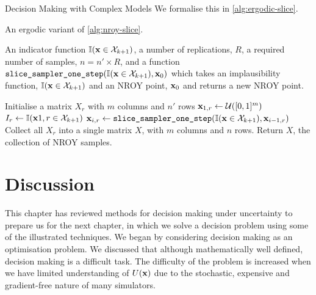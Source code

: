 \begin{chapter}{Decision Making with Complex Models \label{Chap:optimisation}}
We formalise this in \cref{alg:ergodic-slice}.

\begin{algorithm}[h]
\caption{An ergodic variant of \cref{alg:nroy-slice}. \label{alg:ergodic-slice}}
\begin{algorithmic}
\Require An indicator function $\mathbb{I}(\mathbf{x} \in \mathcal{X}_{k+1})$, a number of replications, $R$, a required number of samples, $n =  n' \times R$, and a function $\texttt{slice\_sampler\_one\_step}(\mathbb{I}(\mathbf{x} \in \mathcal{X}_{k+1}), \mathbf{x}_0)$ which takes an implausibility function, $\mathbb{I}(\mathbf{x} \in \mathcal{X}_{k+1})$ and an NROY point, $\mathbf{x}_0$ and returns a new NROY point.

  \State Initialise a matrix $X_r$ with $m$ columns and $n'$ rows
    \State $\mathbf{x}_{1, r} \gets \mathcal{U}([0, 1]^m)$
    \State $I_r \gets \mathbb{I}(\mathbf{x}{1, r} \in \mathcal{X}_{k+1})$
  \EndWhile
  \State $\mathbf{x}_{i, r} \gets \texttt{slice\_sampler\_one\_step}(\mathbb{I}(\mathbf{x} \in \mathcal{X}_{k+1}), \mathbf{x}_{i-1, r})$
\EndFor
\EndFor
\State Collect all $X_r$ into a single matrix $X$, with $m$ columns and $n$ rows.
\State Return $X$, the collection of NROY samples.
\end{algorithmic}
\end{algorithm}

\section{Discussion}

This chapter has reviewed methods for decision making under uncertainty to prepare us for the next chapter, in which we solve a decision problem using some of the illustrated techniques. We began by considering decision making as an optimisation problem. We discussed that although mathematically well defined, decision making is a difficult task. The difficulty of the problem is increased when we have limited understanding of $U(\mathbf{x})$ due to the stochastic, expensive and gradient-free nature of many simulators.


\end{chapter}
